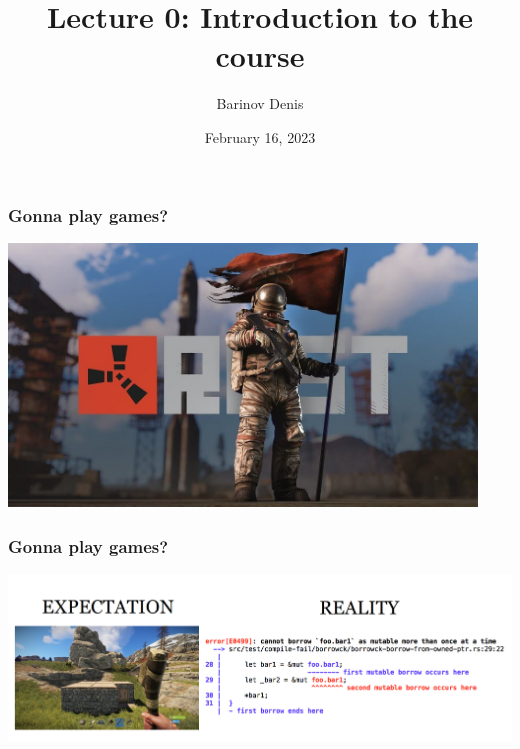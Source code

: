 \documentclass[aspectratio=1610,t]{beamer}
\title{Lecture 0: Introduction to the course}
\date{February 16, 2023}
\author{Barinov Denis}
\institute{barinov.diu@gmail.com}
\begin{document}

\begin{frame}
\maketitle
\end{frame}


\begin{frame}[c]
\frametitle{Gonna play games?}
\begin{center}
    \includegraphics[width=\textwidth,height=7cm,keepaspectratio]{images/rust_game.jpg}
\end{center}

\end{frame}


\begin{frame}[c]
\frametitle{Gonna play games?}
\begin{center}
    \includegraphics[width=\textwidth,keepaspectratio]{images/borrow_error_mem.png}
\end{center}
\end{frame}

\end{document}
